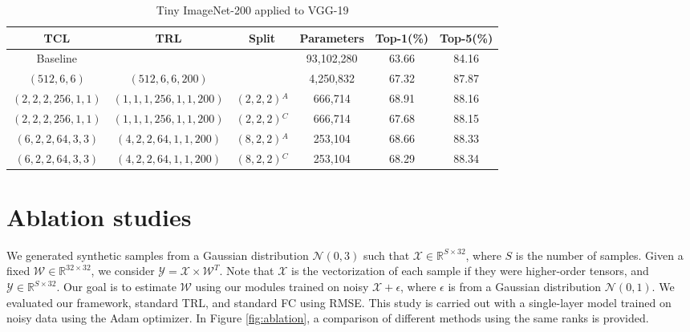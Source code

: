 \documentclass{article}
\begin{document}
\begin{table}
	\caption{Tiny ImageNet-200 applied to VGG-19}
	\label{atab-8}
	\centering
	\begin{tabular}{c c c c c c}
			\toprule
		\textbf{TCL} & \textbf{TRL} & \textbf{Split} & \textbf{Parameters} & \textbf{Top-1(\%)} & \textbf{Top-5(\%)} \\
		\midrule
		Baseline & & & 93,102,280 & 63.66 & 84.16 \\
		$(512,6,6)$ & $(512,6,6,200)$ & & 4,250,832 & 67.32 & 87.87 \\
		$(2,2,2,256,1,1)$ & $(1,1,1,256,1,1,200)$ & $(2,2,2)$$^A$ & 666,714 & 68.91 & 88.16 \\
		$(2,2,2,256,1,1)$ & $(1,1,1,256,1,1,200)$ & $(2,2,2)$$^C$ & 666,714 & 67.68 & 88.15 \\
		$(6,2,2,64,3,3)$ & $(4,2,2,64,1,1,200)$ & $(8,2,2)$$^A$ & 253,104 & 68.66 & 88.33 \\
		$(6,2,2,64,3,3)$ & $(4,2,2,64,1,1,200)$ & $(8,2,2)$$^C$ & 253,104 & 68.29 & 88.34 \\
		\hline
	\end{tabular}
\end{table}


\section{Ablation studies}
\label{ablation-study}
We generated synthetic samples from a Gaussian distribution $\mathcal{N}(0, 3)$ such that $\mathcal{X} \in \mathbb{R}^{S \times 32}$, where $S$ is the number of samples. Given a fixed $\mathcal{W} \in \mathbb{R}^{32 \times 32}$, we consider $\mathcal{Y} = \mathcal{X} \times \mathcal{W}^T$. Note that $\mathcal{X}$ is the vectorization of each sample if they were higher-order tensors, and $\mathcal{Y} \in \mathbb{R}^{S \times 32}$. Our goal is to estimate $\mathcal{W}$ using our modules trained on noisy $\mathcal{X} + \epsilon$, where $\epsilon$ is from a Gaussian distribution $\mathcal{N}(0, 1)$. We evaluated our framework, standard TRL, and standard FC using RMSE. This study is carried out with a single-layer model trained on noisy data using the Adam optimizer. In Figure \ref{fig:ablation}, a comparison of different methods using the same ranks is provided.
 
\end{document}
